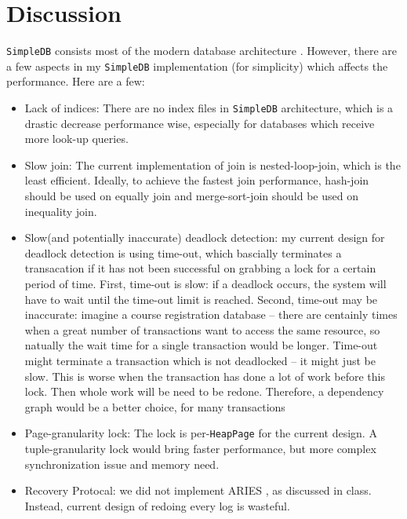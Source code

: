 \documentclass[12pt]{myland}
\def\<#1>{\texttt{#1}}
\begin{document}
\section{Discussion}
	\label{discussion}

    \<SimpleDB> consists most of the modern database architecture \cite{lecture3}. However, there are a
    few aspects in my \<SimpleDB> implementation (for simplicity) which affects the performance. Here are a few:
    \begin{itemize}
        \item Lack of indices: There are no index files in \<SimpleDB> architecture, which is a drastic decrease performance
            wise, especially for databases which receive more look-up queries.
        \item Slow join: The current implementation of join is nested-loop-join, which is the least efficient. Ideally,
            to achieve the fastest join performance, hash-join should be used on equally join and merge-sort-join should
            be used on inequality join.
        \item Slow(and potentially inaccurate) deadlock detection: my current design for deadlock detection is using
            time-out, which bascially terminates a transacation if it has not been successful on grabbing a lock for a
            certain period of time. First, time-out is slow: if a deadlock occurs, the system will have to wait until the
            time-out limit is reached. Second, time-out may be inaccurate: imagine a course registration database -- there
            are centainly times when a great number of transactions want to access the same resource, so natually the
            wait time for a single transaction would be longer. Time-out might terminate a transaction which is not deadlocked --
            it might just be slow. This is worse when the transaction has done a lot of work before this lock. Then whole
            work will be need to be redone. Therefore, a dependency graph would be a better choice, for many transactions
        \item Page-granularity lock: The lock is per-\<HeapPage> for the current design. A tuple-granularity lock would
            bring faster performance, but more complex synchronization issue and memory need.
        \item Recovery Protocal: we did not implement ARIES \cite{lecture18}, as discussed in class.
            Instead, current design of redoing every log is wasteful.
    \end{itemize}
\end{document}
